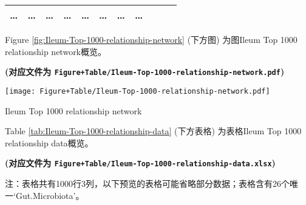 \documentclass[
]{article}
\begin{document}
\begin{longtable}[]{@{}lllllllllll@{}}
\begin{minipage}[t]{0.09\columnwidth}
\ldots{}\strut
\end{minipage} & \begin{minipage}[t]{0.07\columnwidth}\raggedright
\ldots{}\strut
\end{minipage} & \begin{minipage}[t]{0.07\columnwidth}\raggedright
\ldots{}\strut
\end{minipage} & \begin{minipage}[t]{0.09\columnwidth}\raggedright
\ldots{}\strut
\end{minipage} & \begin{minipage}[t]{0.07\columnwidth}\raggedright
\ldots{}\strut
\end{minipage} & \begin{minipage}[t]{0.07\columnwidth}\raggedright
\ldots{}\strut
\end{minipage} & \begin{minipage}[t]{0.07\columnwidth}\raggedright
\ldots{}\strut
\end{minipage} & \begin{minipage}[t]{0.03\columnwidth}\raggedright
\ldots{}\strut
\end{minipage}\tabularnewline
\bottomrule
\end{longtable}

Figure \ref{fig:Ileum-Top-1000-relationship-network} (下方图) 为图Ileum Top 1000 relationship network概览。

\textbf{(对应文件为 \texttt{Figure+Table/Ileum-Top-1000-relationship-network.pdf})}

\def\@captype{figure}
\begin{center}
\texttt{[image: Figure+Table/Ileum-Top-1000-relationship-network.pdf]}
\caption{Ileum Top 1000 relationship network}\label{fig:Ileum-Top-1000-relationship-network}
\end{center}

Table \ref{tab:Ileum-Top-1000-relationship-data} (下方表格) 为表格Ileum Top 1000 relationship data概览。

\textbf{(对应文件为 \texttt{Figure+Table/Ileum-Top-1000-relationship-data.xlsx})}

\begin{center}\begin{tcolorbox}[colback=gray!10, colframe=gray!50, width=0.9\linewidth, arc=1mm, boxrule=0.5pt]注：表格共有1000行3列，以下预览的表格可能省略部分数据；表格含有26个唯一`Gut.Microbiota'。
\end{tcolorbox}
\end{center}
\end{document}
